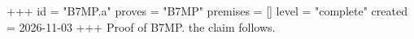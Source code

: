 +++
id = "B7MP.a"
proves = "B7MP"
premises = []
level = "complete"
created = 2026-11-03
+++
Proof of B7MP. the claim follows.
